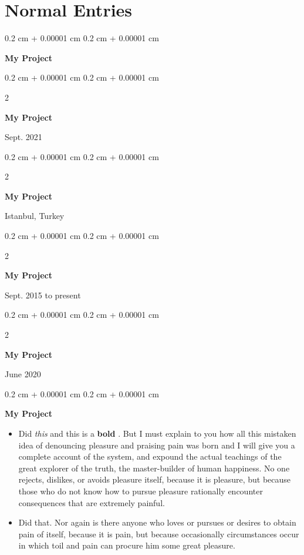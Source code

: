 \documentclass[10pt, letterpaper]{article}
\newenvironment{highlights}{
    \begin{itemize}[
        topsep=0.10 cm,
        parsep=0.10 cm,
        partopsep=0pt,
        itemsep=0pt,
        leftmargin=0.4 cm + 10pt
    ]
}{
    \end{itemize}
} %
\newenvironment{onecolentry}{
    \begin{adjustwidth}{
        0.2 cm + 0.00001 cm
    }{
        0.2 cm + 0.00001 cm
    }
}{
    \end{adjustwidth}
} %
\newenvironment{twocolentry}[2][]{
    \onecolentry
    \def\secondColumn{#2}
    \setcolumnwidth{\fill, 4.5 cm}
    \begin{paracol}{2}
}{
    \switchcolumn \raggedleft \secondColumn
    \end{paracol}
    \endonecolentry
} %
\let\hrefWithoutArrow\href
\renewcommand{\href}[2]{\hrefWithoutArrow{#1}{\mbox{\ifthenelse{\equal{#2}{}}{ }{#2 }\raisebox{.15ex}{\footnotesize \faExternalLink*}}}}
\begin{document}
    
    \section{Normal Entries}



        
        \begin{onecolentry}
            \textbf{My Project}
        \end{onecolentry}


        \vspace{0.2 cm}

        \begin{twocolentry}{
            Sept. 2021
        }
            \textbf{My Project}
        \end{twocolentry}


        \vspace{0.2 cm}

        \begin{twocolentry}{
            Istanbul, Turkey
        }
            \textbf{My Project}
        \end{twocolentry}


        \vspace{0.2 cm}

        \begin{twocolentry}{
            Sept. 2015 to present
        }
            \textbf{My Project}
        \end{twocolentry}


        \vspace{0.2 cm}

        \begin{twocolentry}{
            June 2020
        }
            \textbf{My Project}
        \end{twocolentry}


        \vspace{0.2 cm}

        \begin{onecolentry}
            \textbf{My Project}
            \begin{highlights}
                \item Did \textit{this} and this is a \textbf{bold} \href{https://example.com}{link}. But I must explain to you how all this mistaken idea of denouncing pleasure and praising pain was born and I will give you a complete account of the system, and expound the actual teachings of the great explorer of the truth, the master-builder of human happiness. No one rejects, dislikes, or avoids pleasure itself, because it is pleasure, but because those who do not know how to pursue pleasure rationally encounter consequences that are extremely painful.
                \item Did that. Nor again is there anyone who loves or pursues or desires to obtain pain of itself, because it is pain, but because occasionally circumstances occur in which toil and pain can procure him some great pleasure.
            \end{highlights}
        \end{onecolentry}
\end{document}
